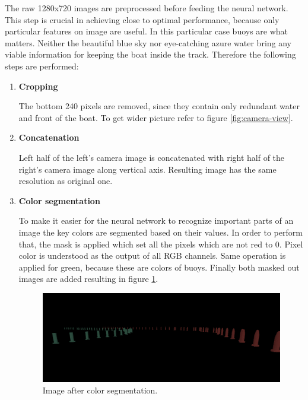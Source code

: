 The raw 1280x720 images are preprocessed before feeding the neural network. This step is crucial in achieving close to optimal performance, because only particular features on image are useful. In this particular case buoys are what matters. Neither the beautiful blue sky nor eye-catching azure water bring any viable information for keeping the boat inside the track. Therefore the following steps are performed:

\begin{enumerate}
    \item \textbf{Cropping}
    
    The bottom 240 pixels are removed, since they contain only redundant water and front of the boat. To get wider picture refer to figure \ref{fig:camera-view}.
    
    \item \textbf{Concatenation}
    
    Left half of the left's camera image is concatenated with right half of the right's camera image along vertical axis. Resulting image has the same resolution as original one.
    
    \item \textbf{Color segmentation}
    
    To make it easier for the neural network to recognize important parts of an image the key colors are segmented based on their values. In order to perform that, the mask is applied which set all the pixels which are not red to 0. Pixel color is understood as the output of all RGB channels. Same operation is applied for green, because these are colors of buoys. Finally both masked out images are added resulting in figure \ref{fig:color-segmented-image}.
    
    \begin{figure}[h]
        \centering
        \includegraphics[width=16cm]{img/image_color_segmentation.png}
        \caption{Image after color segmentation.}
        \label{fig:color-segmented-image}
    \end{figure}


\end{enumerate}
